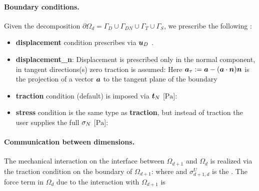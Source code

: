 \paragraph{Boundary conditions.}
Given the decomposition $\partial\Omega_d=\Gamma_D\cup\Gamma_{DN}\cup\Gamma_T\cup\Gamma_S$, we prescribe the following :
\begin{itemize}
\item \textbf{displacement} condition prescribes
via  $\mathbf{\boldsymbol{u}}_D$ .
\item \textbf{displacement\_n}: Displacement is prescribed only in the normal component, in tangent directions(s) zero traction is assumed:
Here $\mathbf{\boldsymbol{a}}_\tau := \mathbf{\boldsymbol{a}} - (\mathbf{\boldsymbol{a}}\cdot\mathbf{\boldsymbol{n}})\mathbf{\boldsymbol{n}}$ is the projection of a vector $\mathbf{\boldsymbol{a}}$ to the tangent plane of the boundary
\item \textbf{traction} condition (default) is imposed via  $\mathbf{\boldsymbol{t}}_N$ [$\mathrm{Pa}$]:
\item \textbf{stress} condition is the same type as \textbf{traction}, but instead of traction the user supplies the full  ${\mathbb{\sigma}}_N$ [$\mathrm{Pa}$]:
\end{itemize}


\paragraph{Communication between dimensions.}
The mechanical interaction on the interface between $\Omega_{d+1}$ and $\Omega_d$ is realized via the traction condition on the boundary of $\Omega_{d+1}$:
where
and $\sigma^U_{d+1,d}$ \units{}{}{} is the .
The force term in $\Omega_d$ due to the interaction with $\Omega_{d+1}$ is





